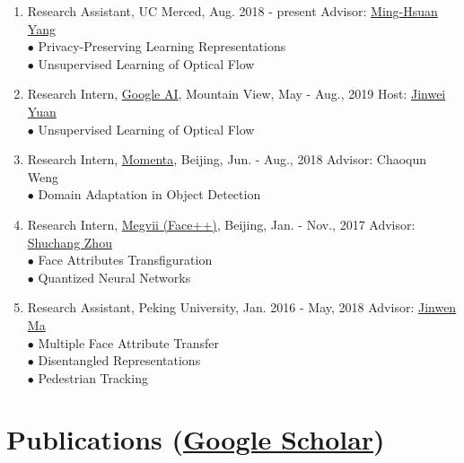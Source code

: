 \documentclass[letterpaper]{article}
\begin{document}
\begin{enumerate}

\item Research Assistant, UC Merced, Aug. 2018 - present \hfill Advisor: \href{http://faculty.ucmerced.edu/mhyang/}{Ming-Hsuan Yang}\\
	$\bullet$ Privacy-Preserving Learning Representations\\
	$\bullet$ Unsupervised Learning of Optical Flow	

\item Research Intern, \href{https://ai.google/}{Google AI}, Mountain View, May - Aug., 2019 \hfill Host: \href{mailto:jinwei@google.com}{Jinwei Yuan}\\
	$\bullet$ Unsupervised Learning of Optical Flow

\item Research Intern, \href{https://www.momenta.ai/en/}{Momenta}, Beijing, Jun. - Aug., 2018 \hfill Advisor: Chaoqun Weng\\
	$\bullet$ Domain Adaptation in Object Detection

\item Research Intern, \href{https://www.faceplusplus.com}{Megvii (Face++)}, Beijing, Jan. - Nov., 2017 \hfill Advisor: \href{https://zsc.github.io/}{Shuchang Zhou}\\
	$\bullet$ Face Attributes Transfiguration\\
	$\bullet$ Quantized Neural Networks

\item Research Assistant, Peking University, Jan. 2016 - May, 2018 \hfill Advisor: \href{http://www.math.pku.edu.cn/is/~jwma/}{Jinwen Ma}\\
	$\bullet$ Multiple Face Attribute Transfer\\
	$\bullet$ Disentangled Representations\\
	$\bullet$ Pedestrian Tracking
	
\end{enumerate}



\section*{Publications (\href{https://scholar.google.com/citations?user=Op_tr2IAAAAJ}{Google Scholar})}
\end{document}
